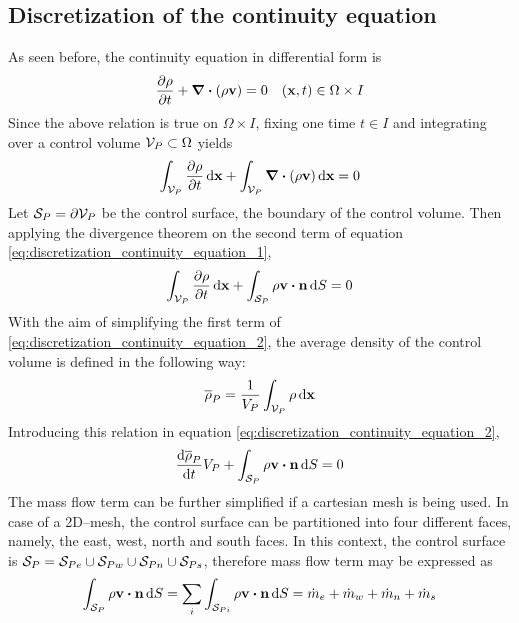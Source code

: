 
\subsection{Discretization of the continuity equation}

As seen before, the continuity equation in differential form is
\begin{equation}
	\pdv{\rho}{t} + \div(\rho \vb{v}) = 0 \quad (\vb{x},t) \in \Omega \times I
\end{equation}
Since the above relation is true on $\Omega \times I$, fixing one time $t \in I$ and integrating over a control volume $\mathcal{V}_{P} \subset \Omega$ yields
\begin{equation} \label{eq:discretization_continuity_equation_1}
	\int_{\mathcal{V}_{P}} \pdv{\rho}{t} \dd{\vb{x}} + \int_{\mathcal{V}_{P}} \div(\rho \vb{v}) \dd{\vb{x}} = 0
\end{equation}
Let $\mathcal{S}_{P} = \partial \mathcal{V}_{P}$ be the control surface, \ie the boundary of the control volume. Then applying the divergence theorem on the second term of equation \eqref{eq:discretization_continuity_equation_1},
\begin{equation} \label{eq:discretization_continuity_equation_2}
	\int_{\cv{P}} \pdv{\rho}{t} \dd{\vb{x}} + 
	\int_{\cs{P}} \rho \vb{v} \vdot \vb{n} \dd{S} = 0
\end{equation}
With the aim of simplifying the first term of \eqref{eq:discretization_continuity_equation_2}, the average density of the control volume is defined in the following way:
\begin{equation}
	\overline{\rho}_P = \frac{1}{V_P} \int_{\mathcal{V}_{P}} \rho \dd{\vb{x}}
\end{equation}
Introducing this relation in equation \eqref{eq:discretization_continuity_equation_2},
\begin{equation} \label{eq:discretization_continuity_equation_3}
	\frac{\dd \overline{\rho}_P}{\dd{t}} V_P + 
	\int_{\cs{P}} \rho \vb{v} \vdot \vb{n} \dd{S} = 0
\end{equation}
The mass flow term can be further simplified if a cartesian mesh is being used. In case of a 2D--mesh, the control surface can be partitioned into four different faces, namely, the east, west, north and south faces. In this context, the control surface is $\mathcal{S}_{P} = \mathcal{S}_{Pe} \cup \mathcal{S}_{Pw} \cup \mathcal{S}_{Pn} \cup \mathcal{S}_{Ps}$, therefore mass flow term may be expressed as
\begin{equation}
	\int_{\cs{P}} \rho \vb{v} \vdot \vb{n} \dd{S} = 
	\sum_{i} \int_{\cs{Pi}} \rho \vb{v} \vdot \vb{n} \dd{S} = 
	\dot{m}_e + \dot{m}_w + \dot{m}_n + \dot{m}_s
\end{equation}
